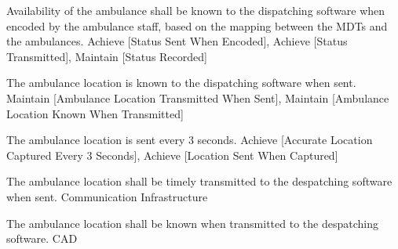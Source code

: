   
    {}
  
  
    {}

  \startkaosspec
  	 {Availability of the ambulance shall be known to the dispatching software when encoded by the ambulance staff, based on the mapping between the MDTs and the ambulances.}
  	 {Achieve [Status Sent When Encoded], Achieve [Status Transmitted], Maintain [Status Recorded]}
  \stopkaosspec
  
  
    {}

  \startkaosspec
  	 {The ambulance location is known to the dispatching software when sent.}
  	 {Maintain [Ambulance Location Transmitted When Sent], Maintain [Ambulance Location Known When Transmitted]}
  \stopkaosspec
  
  \startkaosspec
  	 {The ambulance location is sent every 3 seconds.}
  	 {Achieve [Accurate Location Captured Every 3 Seconds], Achieve [Location Sent When Captured]}
  \stopkaosspec

  \startkaosspec
  	 {The ambulance location shall be timely transmitted to the despatching software when sent.}
  	 {Communication Infrastructure}
  \stopkaosspec

  \startkaosspec
  	 {The ambulance location shall be known when transmitted to the despatching software.}
  	 {CAD}
  \stopkaosspec


